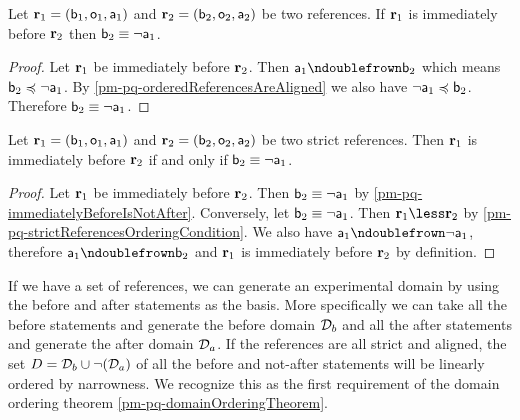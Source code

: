 \begin{mathSection}
	\begin{prop}\label{pm-pq-immediatelyBeforeIsNotAfter}
		Let $\refStmt_1 = ( \stmt[b]_1, \stmt[o]_1, \stmt[a]_1 )$ and $\refStmt_2 = ( \stmt[b]_2, \stmt[o]_2, \stmt[a]_2 )$ be two references. If $\refStmt_1$ is immediately before $\refStmt_2$ then $\stmt[b]_2 \equiv \NOT \stmt[a]_1$.
	\end{prop}
	\begin{proof}
		Let $\refStmt_1$ be immediately before $\refStmt_2$. Then $\stmt[a]_1 \ncomp \stmt[b]_2$ which means $\stmt[b]_2 \narrower \NOT \stmt[a]_1$. By \ref{pm-pq-orderedReferencesAreAligned} we also have $\NOT \stmt[a]_1 \narrower \stmt[b]_2$. Therefore $\stmt[b]_2 \equiv \NOT \stmt[a]_1$.
	\end{proof}
	
	\begin{prop}\label{pm-pq-strictConsecutiveBeforeIsNotAfter}
		Let $\refStmt_1 = ( \stmt[b]_1, \stmt[o]_1, \stmt[a]_1 )$ and $\refStmt_2 = ( \stmt[b]_2, \stmt[o]_2, \stmt[a]_2 )$ be two strict references. Then $\refStmt_1$ is immediately before $\refStmt_2$ if and only if $\stmt[b]_2 \equiv \NOT \stmt[a]_1$.
	\end{prop}
	\begin{proof}
		Let $\refStmt_1$ be immediately before $\refStmt_2$. Then $\stmt[b]_2 \equiv \NOT \stmt[a]_1$ by \ref{pm-pq-immediatelyBeforeIsNotAfter}. Conversely, let $\stmt[b]_2 \equiv \NOT \stmt[a]_1$. Then $\refStmt_1 \less \refStmt_2$ by \ref{pm-pq-strictReferencesOrderingCondition}. We also have $\stmt[a]_1 \ncomp \NOT \stmt[a]_1$, therefore $\stmt[a]_1 \ncomp \stmt[b]_2$ and $\refStmt_1$ is immediately before $\refStmt_2$ by definition.
	\end{proof}
	
\end{mathSection}

If we have a set of references, we can generate an experimental domain by using the before and after statements as the basis. More specifically we can take all the before statements and generate the before domain $\edomain_b$ and all the after statements and generate the after domain $\edomain_a$. If the references are all strict and aligned, the set $D=\edomain_b \cup \NOT (\edomain_a)$ of all the before and not-after statements will be linearly ordered by narrowness. We recognize this as the first requirement of the domain ordering theorem \ref{pm-pq-domainOrderingTheorem}.

